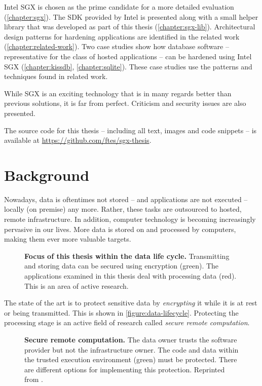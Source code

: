 Intel SGX is chosen as the prime candidate for a more detailed evaluation (\autoref{chapter:sgx}).\label{ID_33539746}
The SDK provided by Intel is presented along with a small helper library that was developed as part of this thesis (\autoref{chapter:sgx-lib}).\label{ID_1352179523}
Architectural design patterns for hardening applications are identified in the related work (\autoref{chapter:related-work}).\label{ID_1745973426}
Two case studies show how database software -- representative for the class of hosted applications -- can be hardened using Intel SGX (\autoref{chapter:kissdb}, \autoref{chapter:sqlite}).\label{ID_148600996}
These case studies use the patterns and techniques found in related work.\label{ID_916299114}

While SGX is an exciting technology that is in many regards better than previous solutions, it is far from perfect.\label{ID_1005742561}
Criticism and security issues are also presented.\label{ID_1799898232}

The source code for this thesis -- including all text, images and code snippets -- is available at \url{https://github.com/ftes/sgx-thesis}.\label{ID_1636604444}

\chapter{Background\label{ID_941070001}\label{chapter:background}}
Nowadays, data is oftentimes not stored -- and applications are not executed -- locally (on premise) any more. Rather, these tasks are outsourced to hosted, remote infrastructure. In addition, computer technology is becoming increasingly pervasive in our lives. More data is stored on and processed by computers, making them ever more valuable targets.\label{ID_1470188624}
\begin{figure}[htbp]
\makebox[\textwidth][c]{
}\caption{\textbf{Focus of this thesis within the data life cycle.}\label{ID_1160378356}
Transmitting and storing data can be secured using encryption (green). The applications examined in this thesis deal with processing data (red). This is an area of active research.\label{ID_745166579}
\label{ID_671023153}\label{figure:data-lifecycle}}
\end{figure}

The state of the art is to protect sensitive data by \textit{encrypting} it while it is at rest or being transmitted. This is shown in \autoref{figure:data-lifecycle}.\label{ID_1880219695}
Protecting the processing stage is an active field of research called \textit{secure remote computation}.\label{ID_1852842699}
\begin{figure}[htbp]
\makebox[\textwidth][c]{
}\caption{\textbf{Secure remote computation.}\label{ID_1573575704}
The data owner trusts the software provider but not the infrastructure owner. The code and data within the trusted execution environment (green) must be protected. There are different options for implementing this protection.\label{ID_532436106}
Reprinted from \cite{sgx-explained}.\label{ID_28551827}
\label{ID_50207747}\label{figure:secure-remote-computation}}
\end{figure}

